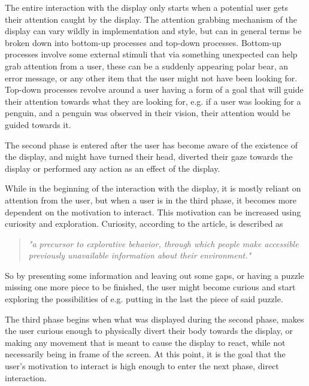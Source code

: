     The entire interaction with the display only starts when a potential user gets their attention caught by the display. The attention grabbing mechanism of the display can vary wildly in implementation and style, but can in general terms be broken down into bottom-up processes and top-down processes\cite{interactivePublicDisplays}. Bottom-up processes involve some external stimuli that via something unexpected can help grab attention from a user, these can be a suddenly appearing polar bear, an error message, or any other item that the user might not have been looking for\cite{interactivePublicDisplays}. Top-down processes revolve around a user having a form of a goal that will guide their attention towards what they are looking for\cite{interactivePublicDisplays}, e.g. if a user was looking for a penguin, and a penguin was observed in their vision, their attention would be guided towards it.
    
    The second phase is entered after the user has become aware of the existence of the display, and might have turned their head, diverted their gaze towards the display or performed any action as an effect of the display\cite{interactivePublicDisplays}.
    
    While in the beginning of the interaction with the display, it is mostly reliant on attention from the user, but when a user is in the third phase, it becomes more dependent on the motivation to interact\cite{interactivePublicDisplays}. This motivation can be increased using curiosity and exploration\cite{interactivePublicDisplays}. Curiosity, according to the article, is described as 
    \begin{quote}
        \textit{"a precursor to explorative behavior, through which people make accessible previously unavailable information about their environment."}\cite{interactivePublicDisplays}
    \end{quote}
    So by presenting some information and leaving out some gaps, or having a puzzle missing one more piece to be finished, the user might become curious and start exploring the possibilities of e.g. putting in the last the piece of said puzzle\cite{interactivePublicDisplays}.
    
    The third phase begins when what was displayed during the second phase, makes the user curious enough to physically divert their body towards the display, or making any movement that is meant to cause the display to react, while not necessarily being in frame of the screen. At this point, it is the goal that the user's motivation to interact is high enough to enter the next phase, direct interaction\cite{interactivePublicDisplays}.
    
